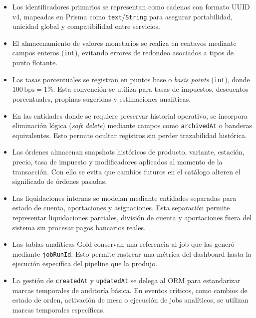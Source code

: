 \begin{itemize}
  \item Los identificadores primarios se representan como cadenas con formato UUID v4,
  mapeadas en Prisma como \texttt{text}/\texttt{String} para asegurar portabilidad,
  unicidad global y compatibilidad entre servicios.

  \item El almacenamiento de valores monetarios se realiza en centavos mediante campos
  enteros (\texttt{int}), evitando errores de redondeo asociados a tipos de punto flotante.

  \item Las tasas porcentuales se registran en puntos base o \textit{basis points}
  (\texttt{int}), donde $100\,\text{bps} = 1\%$. Esta convención se utiliza para tasas de
  impuestos, descuentos porcentuales, propinas sugeridas y estimaciones analíticas.

  \item En las entidades donde se requiere preservar historial operativo, se incorpora
  eliminación lógica (\textit{soft delete}) mediante campos como \texttt{archivedAt} o
  banderas equivalentes. Esto permite ocultar registros sin perder trazabilidad histórica.

  \item Las órdenes almacenan snapshots históricos de producto, variante, estación,
  precio, tasa de impuesto y modificadores aplicados al momento de la transacción. Con
  ello se evita que cambios futuros en el catálogo alteren el significado de órdenes
  pasadas.

  \item Las liquidaciones internas se modelan mediante entidades separadas para estado de
  cuenta, aportaciones y asignaciones. Esta separación permite representar liquidaciones
  parciales, división de cuenta y aportaciones fuera del sistema sin procesar pagos
  bancarios reales.

  \item Las tablas analíticas Gold conservan una referencia al job que las generó mediante
  \texttt{jobRunId}. Esto permite rastrear una métrica del dashboard hasta la ejecución
  específica del pipeline que la produjo.

  \item La gestión de \texttt{createdAt} y \texttt{updatedAt} se delega al ORM para
  estandarizar marcas temporales de auditoría básica. En eventos críticos, como cambios
  de estado de orden, activación de mesa o ejecución de jobs analíticos, se utilizan
  marcas temporales específicas.
\end{itemize}


